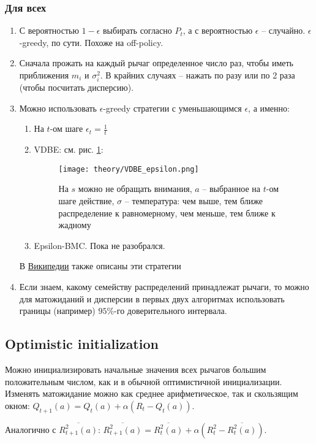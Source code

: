 \subsubsection{Для всех}
\begin{enumerate}
    \item С вероятностью $1-\epsilon$ выбирать согласно $P_t$, а с вероятностью $\epsilon$ -- случайно. $\epsilon$-greedy, по сути. Похоже на off-policy.
    \item Сначала прожать на каждый рычаг определенное число раз, чтобы иметь приближения $m_i$ и $\sigma_i^2$. В крайних случаях -- нажать по разу или по 2 раза (чтобы посчитать дисперсию).
    \item Можно использовать $\epsilon$-greedy стратегии с уменьшающимся $\epsilon$, а именно:
    \begin{enumerate}
        \item На $t$-ом шаге $\epsilon_t = \frac{1}{t}$ \cite{srank}
        \item VDBE: см. рис. \ref{fig:VDBE_epsilon}:
        \begin{figure}
            \texttt{[image: theory/VDBE\_epsilon.png]}
            \caption{\label{fig:VDBE_epsilon} На $s$ можно не обращать внимания, $a$ -- выбранное на $t$-ом шаге действие, $\sigma$ -- температура: чем выше, тем ближе распределение к равномерному, чем меньше, тем ближе к жадному \cite{tolic_VDBE}}
        \end{figure}
        \item Epsilon-BMC. Пока не разобрался.
    \end{enumerate}
    В \href{https://en.wikipedia.org/wiki/Multi-armed_bandit}{Википедии} также описаны эти стратегии
    \item Если знаем, какому семейству распределений принадлежат рычаги, то можно для матожиданий и дисперсии в первых двух алгоритмах использовать границы (например) $95\%$-го доверительного интервала.
\end{enumerate}

\subsection{Optimistic initialization}
Можно инициализировать начальные значения всех рычагов большим положительным числом, как и в обычной оптимистичной инициализации. Изменять матожидание можно как среднее арифметическое, так и скользящим окном: $Q_{t+1}(a) = Q_t(a) + \alpha (R_t - Q_t(a))$.

Аналогично с $\overline{R_{t+1}^2(a)}$: $\overline{R_{t+1}^2(a)} = \overline{R_{t}^2(a)} + \alpha (R_t^2 - \overline{R_{t}^2(a)})$.

